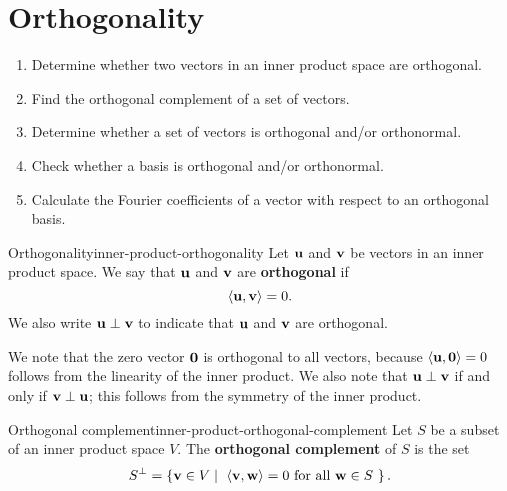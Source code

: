\section{Orthogonality}

\begin{outcome}
  \begin{enumerate}
  \item Determine whether two vectors in an inner product space are
    orthogonal.
  \item Find the orthogonal complement of a set of vectors.
  \item Determine whether a set of vectors is orthogonal and/or orthonormal.
  \item Check whether a basis is orthogonal and/or orthonormal.
  \item Calculate the Fourier coefficients of a vector with respect to
    an orthogonal basis.
  \end{enumerate}
\end{outcome}

\begin{definition}{Orthogonality}{inner-product-orthogonality}
  Let $\vect{u}$ and $\vect{v}$ be vectors in an inner product space.
  We say that $\vect{u}$ and $\vect{v}$ are \textbf{orthogonal}%
   if
  \begin{equation*}
    \iprod{\vect{u}, \vect{v}} = 0.
  \end{equation*}
  We also write $\vect{u}\orth\vect{v}$ to indicate that $\vect{u}$
  and $\vect{v}$ are orthogonal.
\end{definition}

We note that the zero vector $\vect{0}$ is orthogonal to all vectors,
because $\iprod{\vect{u},\vect{0}} = 0$ follows from the linearity of
the inner product. We also note that $\vect{u}\orth\vect{v}$ if and
only if $\vect{v}\orth\vect{u}$; this follows from the symmetry of the
inner product.

\begin{definition}{Orthogonal complement}{inner-product-orthogonal-complement}
  Let $S$ be a subset of an inner product space $V$. The
  \textbf{orthogonal complement}%
   of $S$ is the set
  \begin{equation*}
    S^{\orth} = \set{\vect{v}\in V \mid
      \mbox{
        $\iprod{\vect{v},\vect{w}} = 0$ for all $\vect{w}\in S$
      }}.
  \end{equation*}
\end{definition}

